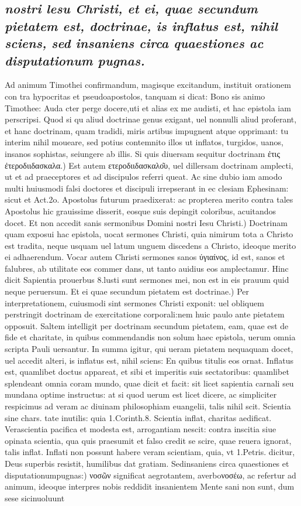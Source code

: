 \documentclass{article}
\begin{document}
\begin{pages}
\subsection*{\textit{nostri lesu Christi, et ei, quae secundum pietatem est, doctrinae, is inflatus est, nihil sciens, sed insaniens circa quaestiones ac disputationum pugnas. }}\pstart Ad animum Timothei confirmandum, magisque excitandum, instituit orationem con tra hypocritas et pseudoapostolos, tanquam si dicat: Bono sis animo Timothee: Auda cter perge docere,uti et alias ex me audisti, et hac epistola iam perscripsi. Quod si qu aliud doctrinae genus exigant, uel nonnulli aliud proferant, et hanc doctrinam, quam tradidi, miris artibus impugnent atque opprimant: tu interim nihil moueare, sed potius contemnito illos ut inflatos, turgidos, uanos, insanos sophistas, seiungere ab illis.  \pend\pstart Si quis diuersam sequitur doctrinam ἐτις ἐτεροδιιδασκαλα.) Est autem ετεροδιιδασκαλο͂υ, uel dillersam doctrinam amplecti, ut et ad praeceptores et ad discipulos referri queat. Ac sine dubio iam amodo multi huiusmodi falsi doctores et discipuli irrepserant in ec clesiam Ephesinam: sicut et Act.2o. Apostolus futurum praedixerat: ac propterea merito contra tales Apostolus hic grauissime disserit, eosque suis depingit coloribus, acuitandos docet.  \pend\pstart Et non accedit sanis sermonibus Domini nostri Iesu Christi.) Doctrinam quam exposui hac epistola, uocat sermones Christi, quia nimirum tota a Christo est tradita, neque usquam uel latum unguem discedens a Christo, ideoque merito ei adhaerendum. Vocar autem Christi sermones sanos ύγιαίνος, id est, sanos et falubres, ab utilitate eos commer dans, ut tanto auidius eos amplectamur. Hinc dicit Sapientia prouerbus 8.lusti sunt sermones mei, non est in eis prauum quid neque peruersum.  \pend\pstart Et ei quae secundum pietatem est doctrinae.) Per interpretationem, cuiusmodi sint sermones Christi exponit: uel obliquem perstringit doctrinam de exercitatione corporali:nem huic paulo ante pietatem opposuit. Saltem intelligit per doctrinam secundum pietatem, eam, quae est de fide et charitate, in quibus commendandis non solum haec epistola, uerum omnia scripta Pauli uersantur. In summa igitur, qui ueram pietatem nequaquam docet, uel accedit alteri, is inflatus est, nihil sciens: En quibus titulis eos ornat. Inflatus est, quamlibet doctus appareat, et sibi et imperitis suis sectatoribus: quamlibet splendeant omnia coram mundo, quae dicit et facit: sit licet sapientia carnali seu mundana optime instructus: at si quod uerum est licet dicere, ac simpliciter respicimus ad veram ac diuinam philosophiam euangelii, talis nihil scit. Scientia sine chars. tate inutilis: quia 1.Corinth.8. Scientia inflat, charitas aedificat. Verascientia pacifica et modesta est, arrogantiam nescit: contra inscitia siue opinata scientia, qua quis praesumit et falso credit se scire, quae reuera ignorat, talis inflat. Inflati non possunt habere veram scientiam, quia, vt 1.Petris. dicitur, Deus superbis resistit, humilibus dat gratiam. Sedinsaniens circa quaestiones et disputationumpugnas:) νοσῶν significat aegrotantem, averboνοσέω, ac refertur ad animum, ideoque interpres nobis reddidit insanientem Mente sani non sunt, dum sese sicinuoluunt 
\end{pages}
\end{document}
